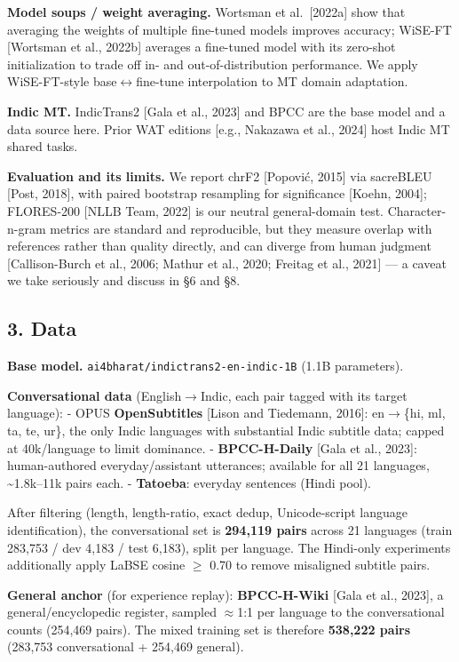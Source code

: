\documentclass[
  11pt,
]{article}
\begin{document}
\textbf{Model soups / weight averaging.} Wortsman et al.~{[}2022a{]}
show that averaging the weights of multiple fine-tuned models improves
accuracy; WiSE-FT {[}Wortsman et al., 2022b{]} averages a fine-tuned
model with its zero-shot initialization to trade off in- and
out-of-distribution performance. We apply WiSE-FT-style base$\leftrightarrow$fine-tune
interpolation to MT domain adaptation.

\textbf{Indic MT.} IndicTrans2 {[}Gala et al., 2023{]} and BPCC are the
base model and a data source here. Prior WAT editions {[}e.g., Nakazawa
et al., 2024{]} host Indic MT shared tasks.

\textbf{Evaluation and its limits.} We report chrF2 {[}Popović, 2015{]}
via sacreBLEU {[}Post, 2018{]}, with paired bootstrap resampling for
significance {[}Koehn, 2004{]}; FLORES-200 {[}NLLB Team, 2022{]} is our
neutral general-domain test. Character-n-gram metrics are standard and
reproducible, but they measure overlap with references rather than
quality directly, and can diverge from human judgment {[}Callison-Burch
et al., 2006; Mathur et al., 2020; Freitag et al., 2021{]} --- a caveat
we take seriously and discuss in §6 and §8.

\hypertarget{data}{%
\subsection{3. Data}\label{data}}

\textbf{Base model.} \texttt{ai4bharat/indictrans2-en-indic-1B} (1.1B
parameters).

\textbf{Conversational data} (English$\to$Indic, each pair tagged with its
target language): - OPUS \textbf{OpenSubtitles} {[}Lison and Tiedemann,
2016{]}: en$\to$\{hi, ml, ta, te, ur\}, the only Indic languages with
substantial Indic subtitle data; capped at 40k/language to limit
dominance. - \textbf{BPCC-H-Daily} {[}Gala et al., 2023{]}:
human-authored everyday/assistant utterances; available for all 21
languages, \textasciitilde1.8k--11k pairs each. - \textbf{Tatoeba}:
everyday sentences (Hindi pool).

After filtering (length, length-ratio, exact dedup, Unicode-script
language identification), the conversational set is \textbf{294,119
pairs} across 21 languages (train 283,753 / dev 4,183 / test 6,183),
split per language. The Hindi-only experiments additionally apply LaBSE
cosine $\ge$ 0.70 to remove misaligned subtitle pairs.

\textbf{General anchor} (for experience replay): \textbf{BPCC-H-Wiki}
{[}Gala et al., 2023{]}, a general/encyclopedic register, sampled $\approx$1:1
per language to the conversational counts (254,469 pairs). The mixed
training set is therefore \textbf{538,222 pairs} (283,753 conversational
+ 254,469 general).
\end{document}
